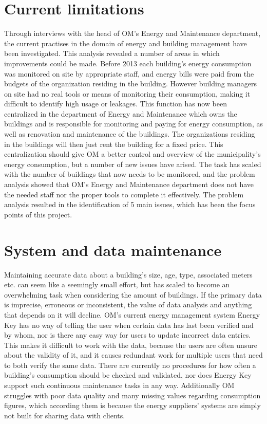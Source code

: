 \section{Current limitations}
Through interviews with the head of OM’s Energy and Maintenance department, the current practises in the domain of energy and building management have been investigated. This analysis revealed a number of areas in which improvements could be made. Before 2013 each building's energy consumption was monitored on site by appropriate staff, and energy bills were paid from the budgets of the organization residing in the building. However building managers on site had no real tools or means of monitoring their consumption, making it difficult to identify high usage or leakages. This function has now been centralized in the department of Energy and Maintenance which owns the buildings and is responsible for monitoring and paying for energy consumption, as well as renovation and maintenance of the buildings. The organizations residing in the buildings will then just rent the building for a fixed price. This centralization should give OM a better control and overview of the municipality’s energy consumption, but a number of new issues have arised. The task has scaled with the number of buildings that now needs to be monitored, and the problem analysis showed that OM’s Energy and Maintenance department does not have the needed staff nor the proper tools to complete it effectively. The problem analysis resulted in the identification of 5 main issues, which has been the focus points of this project.
\section*{System and data maintenance}
Maintaining accurate data about a building's size, age, type, associated meters etc. can seem like a seemingly small effort, but has scaled to become an overwhelming task when considering the amount of buildings. If the primary data is imprecise, erroneous or inconsistent, the value of data analysis and anything that depends on it will decline. OM’s current energy management system Energy Key has no way of telling the user when certain data has last been verified and by whom, nor is there any easy way for users to update incorrect data entries. This makes it difficult to work with the data, because the users are often unsure about the validity of it, and it causes redundant work for multiple users that need to both verify the same data. There are currently no procedures for how often a building's consumption should be checked and validated, nor does Energy Key support such continuous maintenance tasks in any way. Additionally OM struggles with poor data quality and many missing values regarding consumption figures, which according them is because the energy suppliers’ systems are simply not built for sharing data with clients.
